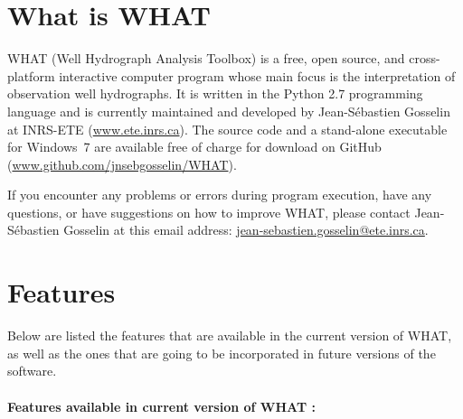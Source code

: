 \documentclass[WHATMANUAL.tex]{subfiles}
\begin{document}
\section{What is WHAT}

WHAT (Well Hydrograph Analysis Toolbox) is a free, open source, and cross-platform interactive computer program whose main focus is the interpretation of observation well hydrographs. It is written in the Python 2.7 programming language and is currently maintained and developed by Jean-Sébastien Gosselin at INRS-ETE (\url{www.ete.inrs.ca}). The source code and a stand-alone executable for Windows~7 are available free of charge for download on GitHub (\url{www.github.com/jnsebgosselin/WHAT}).

If you encounter any problems or errors during program execution, have any questions, or have suggestions on how to improve WHAT, please contact Jean-Sébastien Gosselin at this email address: \href{mailto:jean-sebastien.gosselin@ete.inrs.ca}{jean-sebastien.gosselin@ete.inrs.ca}.

\section{Features}

Below are listed the features that are available in the current version of WHAT, as well as the ones that are going to be incorporated in future versions of the software.

\paragraph*{Features available in current version of WHAT :}
\end{document}
